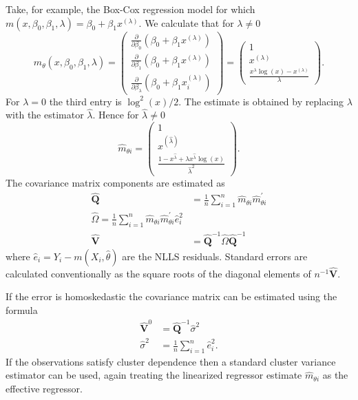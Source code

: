 \documentclass[10pt]{article}
\begin{document}
Take, for example, the Box-Cox regression model for which $m\left(x, \beta_{0}, \beta_{1}, \lambda\right)=\beta_{0}+\beta_{1} x^{(\lambda)}$. We calculate that for $\lambda \neq 0$
$$
m_{\theta}\left(x, \beta_{0}, \beta_{1}, \lambda\right)=\left(\begin{array}{c}
\frac{\partial}{\partial \beta_{0}}\left(\beta_{0}+\beta_{1} x^{(\lambda)}\right) \\
\frac{\partial}{\partial \beta_{1}}\left(\beta_{0}+\beta_{1} x^{(\lambda)}\right) \\
\frac{\partial}{\partial \beta_{\lambda}}\left(\beta_{0}+\beta_{1} x_{i}^{(\lambda)}\right)
\end{array}\right)=\left(\begin{array}{c}
1 \\
x^{(\lambda)} \\
\frac{x^{\lambda} \log (x)-x^{(\lambda)}}{\lambda}
\end{array}\right) .
$$
For $\lambda=0$ the third entry is $\log ^{2}(x) / 2$. The estimate is obtained by replacing $\lambda$ with the estimator $\hat{\lambda}$. Hence for $\widehat{\lambda} \neq 0$
$$
\widehat{m}_{\theta i}=\left(\begin{array}{c}
1 \\
x^{(\widehat{\lambda})} \\
\frac{1-x^{\hat{\lambda}}+\lambda x^{\hat{\lambda}} \log (x)}{\hat{\lambda}^{2}}
\end{array}\right) .
$$
The covariance matrix components are estimated as
$$
\begin{aligned}
\widehat{\boldsymbol{Q}} &=\frac{1}{n} \sum_{i=1}^{n} \widehat{m}_{\theta i} \widehat{m}_{\theta i}^{\prime} \\
\widehat{\Omega}=\frac{1}{n} \sum_{i=1}^{n} \widehat{m}_{\theta i} \widehat{m}_{\theta i}^{\prime} \widehat{e}_{i}^{2} \\
\widehat{\boldsymbol{V}} &=\widehat{\boldsymbol{Q}}^{-1} \widehat{\Omega} \widehat{\boldsymbol{Q}}^{-1}
\end{aligned}
$$
where $\widehat{e}_{i}=Y_{i}-m\left(X_{i}, \widehat{\theta}\right)$ are the NLLS residuals. Standard errors are calculated conventionally as the square roots of the diagonal elements of $n^{-1} \widehat{\boldsymbol{V}}$.

If the error is homoskedastic the covariance matrix can be estimated using the formula
$$
\begin{aligned}
\widehat{\boldsymbol{V}}^{0} &=\widehat{\boldsymbol{Q}}^{-1} \widehat{\sigma}^{2} \\
\widehat{\sigma}^{2} &=\frac{1}{n} \sum_{i=1}^{n} \widehat{e}_{i}^{2} .
\end{aligned}
$$
If the observations satisfy cluster dependence then a standard cluster variance estimator can be used, again treating the linearized regressor estimate $\widehat{m}_{\theta i}$ as the effective regressor.
\end{document}

